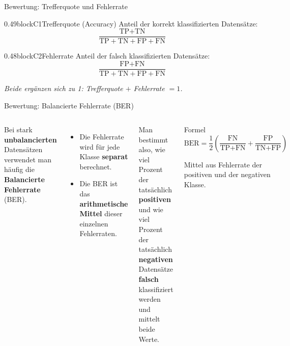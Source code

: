 \begin{frame}{Bewertung: Trefferquote und Fehlerrate}
\begin{blockrow}
\begin{blockcol}{0.49\textwidth}{blockC1}{Trefferquote (Accuracy)}
Anteil der korrekt klassifizierten Datensätze:
\[
  \frac{\text{TP} + \text{TN}}
       {\text{TP} + \text{TN} + \text{FP} + \text{FN}}
\]
\end{blockcol}

\begin{blockcol}{0.48\textwidth}{blockC2}{Fehlerrate}
Anteil der falsch klassifizierten Datensätze:
\[
  \frac{\text{FP} + \text{FN}}
       {\text{TP} + \text{TN} + \text{FP} + \text{FN}}
\]
\end{blockcol}
\end{blockrow}

\vspace{0.6em}
\centering
{\footnotesize\itshape Beide ergänzen sich zu 1: Trefferquote $+$
Fehlerrate $= 1$.}
\end{frame}


\begin{frame}{Bewertung: Balancierte Fehlerrate (BER)}
\begin{columns}
Bei stark \textbf{unbalancierten} Datensätzen verwendet man häufig die
\textbf{Balancierte Fehlerrate} (BER).

\vspace{0.4em}
\begin{itemize}
  \item Die Fehlerrate wird für jede Klasse \textbf{separat} berechnet.
  \item Die BER ist das \textbf{arithmetische Mittel} dieser einzelnen
        Fehlerraten.
\end{itemize}

\vspace{0.4em}
Man bestimmt also, wie viel Prozent der tatsächlich \textbf{positiven} und
wie viel Prozent der tatsächlich \textbf{negativen} Datensätze
\textbf{falsch} klassifiziert werden und mittelt beide Werte.

\begin{blockC1}{Formel}
\[
  \text{BER} = \frac{1}{2}\!\left(
    \frac{\text{FN}}{\text{TP} + \text{FN}}
    +
    \frac{\text{FP}}{\text{TN} + \text{FP}}
  \right)
\]
\vspace{0.2em}

{\footnotesize Mittel aus Fehlerrate der positiven und der negativen
Klasse.}
\end{blockC1}
\end{columns}
\end{frame}

